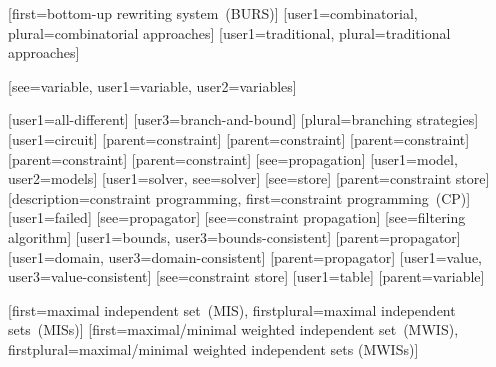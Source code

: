 %
        [first=bottom-up rewriting system~(BURS)]
%
        [user1={combinatorial}, plural={combinatorial approaches}]
%
        [user1={traditional}, plural={traditional approaches}]

[see={variable}, user1={variable}, user2={variables}]

[user1={all-different}]
[user3={branch-and-bound}]
[plural={branching strategies}]
[user1={circuit}]
[parent={constraint}]
[parent={constraint}]
[parent={constraint}]
[parent={constraint}]
[parent={constraint}]
[see={propagation}]
[user1={model}, user2={models}]
[user1={solver}, see={solver}]
[see={store}]
[parent={constraint store}]
%
        [description={constraint programming},
         first={constraint programming~(CP)}]
[user1={failed}]
[see={propagator}]
[see={constraint propagation}]
[see={filtering algorithm}]
[user1={bounds}, user3={bounds-consistent}]
[parent={propagator}]
[user1={domain}, user3={domain-consistent}]
[parent={propagator}]
[user1={value}, user3={value-consistent}]
[see={constraint store}]
[user1={table}]
[parent={variable}]


%
        [first={maximal independent set~(MIS)},
         firstplural={maximal independent sets~(MISs)}]
%
        [first={maximal/minimal weighted independent set~(MWIS)},
         firstplural={maximal/minimal weighted independent sets (MWISs)}]

